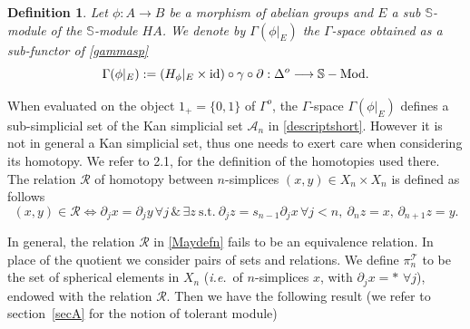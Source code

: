 \documentclass[cupthm]{CUP-JNL-JMJ}
\numberwithin{equation}{section}
\theoremstyle{cupplain}
\theoremstyle{cupdefinition}
\newtheorem{definition}{Definition}[section]
\theoremstyle{cupremark}
\theoremstyle{cupproof}
\def\S{{\mathbb S}}
\def\cR{{\mathcal R}}
\def\cT{{\mathcal T}}
\def\sss{{\S}}
\def\id{{\rm id}}
\def\pik{\pi^{\cT}}
\def\dop{{\Delta^o}}
\def\gop{{\Gamma^{o}}}
\def\smod{{\sss-{\rm{Mod}}}}
\newcommand{\ie}{{\it i.e.\/}\ }
\begin{document}
\begin{appendix}
 \begin{definition}  Let $\phi:A\to B$ be  a morphism of abelian groups and $E$ a sub $\sss$-module of the $\sss$-module $HA$. We denote by $ \Gamma(\phi\vert_E)$ 
 	the $\Gamma$-space obtained as a sub-functor of \eqref{gammasp}
 \begin{equation}\label{descript1sub1}
 \Gamma(\phi\vert_E):= (H_\phi\vert_E\times \id)\circ \gamma\circ \partial : \dop \longrightarrow \smod.
 \end{equation}
 \end{definition}
 
  When evaluated on the object $1_+=\{0,1\}$ of $\gop$, the $\Gamma$-space $\Gamma(\phi\vert_E)$  defines   a sub-simplicial set of the Kan simplicial set $\mathcal A_n$  in \eqref{descriptshort}.  However it is not in general a Kan simplicial set, thus one needs to exert care  when  considering its homotopy.
 We refer to \cite{CCgromov}  2.1,  for the definition of the homotopies  used there. The relation $\cR$ of homotopy between $n$-simplices $(x,y)\in X_n\times X_n$  is defined as follows
\begin{equation}\label{Maydefn}
 (x,y)\in \cR \iff \partial_j x=\partial_jy\, \forall j \, \&\,  \exists z~\text{s.t.}~ \partial_jz=s_{n-1}\partial_j x\, \forall j<n, \ \partial_nz=x,\, \partial_{n+1}z=y.
  \end{equation}

In general, the  relation $\cR$   in  \eqref{Maydefn} fails to be an equivalence relation.  In place of the quotient we consider pairs of sets and relations.  We define $\pik_n$ to be the set  of spherical elements in $X_n$ (\ie of $n$-simplices $x$, with $\partial_j x=*$ $\forall j$), endowed with the relation $\cR$. Then we have the following result (we refer to section~\ref{secA} for the notion of tolerant module)


\end{appendix}
\end{document}
